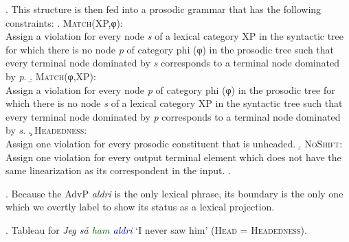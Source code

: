 \documentclass[12pt, letterpaper]{article}
\begin{document}
\ex. This structure is then fed into a prosodic grammar that has the following constraints:
\a. \textsc{Match}(XP,φ):\\
Assign a violation for every node \textit{s} of a lexical category XP in the syntactic tree for which there is no node \textit{p} of category phi (φ) in the prosodic tree such that every terminal node dominated by \textit{s} corresponds to a terminal node dominated by \textit{p}. 
\b. \textsc{Match}(φ,XP):\\
Assign a violation for every node \textit{p} of category phi (φ) in the prosodic tree for which there is no node \textit{s} of a lexical category XP in the syntactic tree such that every terminal node dominated by \textit{p} corresponds to a terminal node dominated by \textit{s}.
\c. \textsc{Headedness}:\\
Assign one violation for every prosodic constituent that is unheaded.
\d. \textsc{NoShift}:\\
Assign one violation for every output terminal element which does not have the same linearization as its correspondent in the input. 
\z.

\ex. Because the AdvP \textit{aldri} is the only lexical phrase, its boundary is the only one which we overtly label to show its status as a lexical projection. 

\ex. \label{ex:OS} Tableau for \textit{Jeg så \textcolor{DarkGreen}{ham} \textcolor{DarkBlue}{aldri}} `I never saw him' (\textsc{Head} = \textsc{Headedness}).\\
\end{document}
